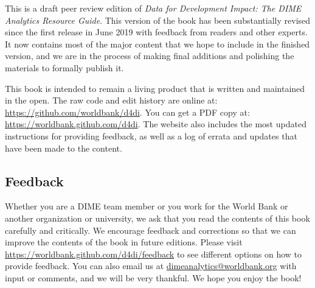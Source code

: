 This is a draft peer review edition of
\textit{Data for Development Impact:
The DIME Analytics Resource Guide}.
This version of the book has been substantially revised
since the first release in June 2019
with feedback from readers and other experts.
It now contains most of the major content
that we hope to include in the finished version,
and we are in the process of making final additions
and polishing the materials to formally publish it.

This book is intended to remain a living product
that is written and maintained in the open.
The raw code and edit history are online at:
\url{https://github.com/worldbank/d4di}.
You can get a PDF copy at:
\url{https://worldbank.github.com/d4di}.
The website also includes the most updated instructions
for providing feedback, as well as
a log of errata and updates that have been made to the content.

\subsection{Feedback}

Whether you are a DIME team member or you work for the World Bank
or another organization or university,
we ask that you read the contents of this book carefully and critically.
We encourage feedback and corrections
so that we can improve the contents of the book
in future editions. Please visit
\url{https://worldbank.github.com/d4di/feedback} to
see different options on how to provide feedback.
You can also email us at \url{dimeanalytics@worldbank.org}
with input or comments, and we will be very thankful.
We hope you enjoy the book!
